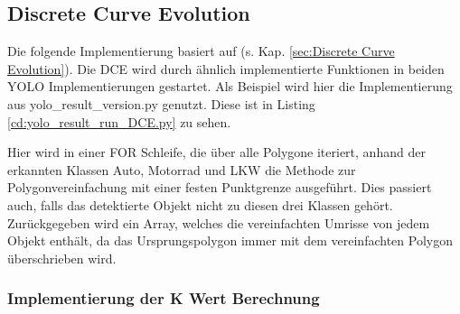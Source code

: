 \subsection{Discrete Curve Evolution}{
	\label{py:DCE}
	Die folgende Implementierung basiert auf \citeauthor{Barkowsky2000} \citep{Barkowsky2000} (s. Kap. \ref{sec:Discrete Curve Evolution}). Die DCE wird durch ähnlich implementierte Funktionen in beiden YOLO Implementierungen gestartet.  \ifimportant Als Beispiel wird hier die Implementierung aus yolo\_result\_version.py genutzt. Diese ist in Listing \ref{cd:yolo_result_run_DCE.py} zu sehen. \fi \\
	\ifimportant
	
	\fi Hier wird in einer FOR Schleife, die über alle Polygone iteriert,  anhand der erkannten Klassen Auto, Motorrad und LKW die Methode zur Polygonvereinfachung mit einer festen Punktgrenze ausgeführt. Dies passiert auch, falls das detektierte Objekt nicht zu diesen drei Klassen gehört. \\ 
	Zurückgegeben wird ein Array, welches die vereinfachten Umrisse von jedem Objekt enthält, da das Ursprungspolygon immer mit dem vereinfachten Polygon überschrieben wird. \\

	\subsubsection{Implementierung der K Wert Berechnung \label{impl:Calc_K_Val}} 

}
